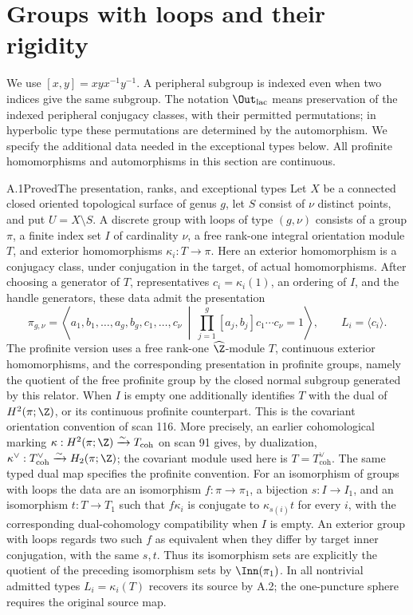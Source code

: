 \section{Groups with loops and their rigidity}
\label{sec:part-a}
We use $[x,y]=xyx^{-1}y^{-1}$. A peripheral subgroup is indexed even when two indices give the same subgroup. The notation $\Out_{\mathrm{lac}}$ means preservation of the indexed peripheral conjugacy classes, with their permitted permutations; in hyperbolic type these permutations are determined by the automorphism. We specify the additional data needed in the exceptional types below. All profinite homomorphisms and automorphisms in this section are continuous.

\begin{claim}{A.1}{Proved}{The presentation, ranks, and exceptional types}
Let $X$ be a connected closed oriented topological surface of genus $g$, let $S$ consist of $\nu$ distinct points, and put $U=X\setminus S$. A discrete group with loops of type $(g,\nu)$ consists of a group $\pi$, a finite index set $I$ of cardinality $\nu$, a free rank-one integral orientation module $T$, and exterior homomorphisms $\kappa_i:T\to\pi$. Here an exterior homomorphism is a conjugacy class, under conjugation in the target, of actual homomorphisms. After choosing a generator of $T$, representatives $c_i=\kappa_i(1)$, an ordering of $I$, and the handle generators, these data admit the presentation
\[
 \pi_{g,\nu}=\left\langle a_1,b_1,\ldots,a_g,b_g,c_1,\ldots,c_\nu\ \middle|\
 \prod_{j=1}^{g}[a_j,b_j]c_1\cdots c_\nu=1\right\rangle,
 \qquad L_i=\langle c_i\rangle.
\]
The profinite version uses a free rank-one $\widehat\Z$-module $T$, continuous exterior homomorphisms, and the corresponding presentation in profinite groups, namely the quotient of the free profinite group by the closed normal subgroup generated by this relator. When $I$ is empty one additionally identifies $T$ with the dual of $H^2(\pi;\Z)$, or its continuous profinite counterpart. This is the covariant orientation convention of scan 116. More precisely, an earlier cohomological marking $\kappa:H^2(\pi;\Z)\xrightarrow{\sim}T_{\mathrm{coh}}$ on scan 91 gives, by dualization, $\kappa^\vee:T_{\mathrm{coh}}^\vee\xrightarrow{\sim}H_2(\pi;\Z)$; the covariant module used here is $T=T_{\mathrm{coh}}^\vee$. The same typed dual map specifies the profinite convention. For an isomorphism of groups with loops the data are an isomorphism $f:\pi\to\pi_1$, a bijection $s:I\to I_1$, and an isomorphism $t:T\to T_1$ such that $f\kappa_i$ is conjugate to $\kappa_{s(i)}t$ for every $i$, with the corresponding dual-cohomology compatibility when $I$ is empty. An exterior group with loops regards two such $f$ as equivalent when they differ by target inner conjugation, with the same $s,t$. Thus its isomorphism sets are explicitly the quotient of the preceding isomorphism sets by $\Inn(\pi_1)$. In all nontrivial admitted types $L_i=\kappa_i(T)$ recovers its source by A.2; the one-puncture sphere requires the original source map.

\end{claim}
